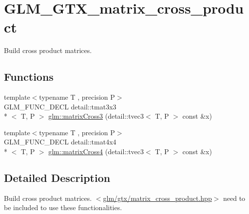 \hypertarget{group__gtx__matrix__cross__product}{\section{G\-L\-M\-\_\-\-G\-T\-X\-\_\-matrix\-\_\-cross\-\_\-product}
\label{group__gtx__matrix__cross__product}
}


Build cross product matrices.  


\subsection*{Functions}
\begin{DoxyCompactItemize}
\item 
{\footnotesize template$<$typename T , precision P$>$ }\\G\-L\-M\-\_\-\-F\-U\-N\-C\-\_\-\-D\-E\-C\-L detail\-::tmat3x3\\*
$<$ T, P $>$ \hyperlink{group__gtx__matrix__cross__product_gaebbd4b4436b55c14b6d0b973167a25e4}{glm\-::matrix\-Cross3} (detail\-::tvec3$<$ T, P $>$ const \&x)
\item 
{\footnotesize template$<$typename T , precision P$>$ }\\G\-L\-M\-\_\-\-F\-U\-N\-C\-\_\-\-D\-E\-C\-L detail\-::tmat4x4\\*
$<$ T, P $>$ \hyperlink{group__gtx__matrix__cross__product_gab3c272adc9c9fc1f7c26d6f353b4bb4b}{glm\-::matrix\-Cross4} (detail\-::tvec3$<$ T, P $>$ const \&x)
\end{DoxyCompactItemize}


\subsection{Detailed Description}
Build cross product matrices. $<$\hyperlink{matrix__cross__product_8hpp}{glm/gtx/matrix\-\_\-cross\-\_\-product.\-hpp}$>$ need to be included to use these functionalities. 

